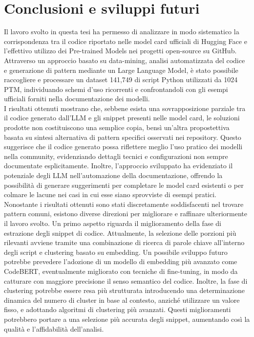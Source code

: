 \documentclass{article}
\begin{document}
\section{Conclusioni e sviluppi futuri}
Il lavoro svolto in questa tesi ha permesso di analizzare in modo sistematico la corrispondenza tra il codice riportato nelle model card ufficiali di Hugging Face e l’effettivo utilizzo dei Pre-trained Models nei progetti open-source su GitHub. Attraverso un approccio basato su data-mining, analisi automatizzata del codice e generazione di pattern mediante un Large Language Model, è stato possibile raccogliere e processare un dataset 141,749 di script Python utilizzati da 1024 PTM, individuando schemi d’uso ricorrenti e confrontandoli con gli esempi ufficiali forniti nella documentazione dei modelli.\\
I risultati ottenuti mostrano che, sebbene esista una sovrapposizione parziale tra il codice generato dall’LLM e gli snippet presenti nelle model card, le soluzioni prodotte non costituiscono una semplice copia, bensì un'altra propostettiva basata su sintesi alternativa di pattern specifici osservati nei repository. Questo suggerisce che il codice generato possa riflettere meglio l’uso pratico dei modelli nella community, evidenziando dettagli tecnici e configurazioni non sempre documentate esplicitamente. Inoltre, l’approccio sviluppato ha evidenziato il potenziale degli LLM nell’automazione della documentazione, offrendo la possibilità di generare suggerimenti per completare le model card esistenti o per colmare le lacune nei casi in cui esse siano sprovviste di esempi pratici.\\
Nonostante i risultati ottenuti sono stati discretamente soddisfacenti nel trovare pattern comuni, esistono diverse direzioni per migliorare e raffinare ulteriormente il lavoro svolto. Un primo aspetto riguarda il miglioramento della fase di estrazione degli snippet di codice. Attualmente, la selezione delle porzioni più rilevanti avviene tramite una combinazione di ricerca di parole chiave all'interno degli script e clustering basato su embedding. Un possibile sviluppo futuro potrebbe prevedere l’adozione di un modello di embedding più avanzato come CodeBERT, eventualmente migliorato con tecniche di fine-tuning, in modo da catturare con maggiore precisione il senso semantico del codice. Inoltre, la fase di clustering potrebbe essere resa più strutturata introducendo una determinazione dinamica del numero di cluster in base al contesto, anziché utilizzare un valore fisso, e adottando algoritmi di clustering più avanzati. Questi miglioramenti potrebbero portare a una selezione più accurata degli snippet, aumentando così la qualità e l’affidabilità dell’analisi.
\end{document}
